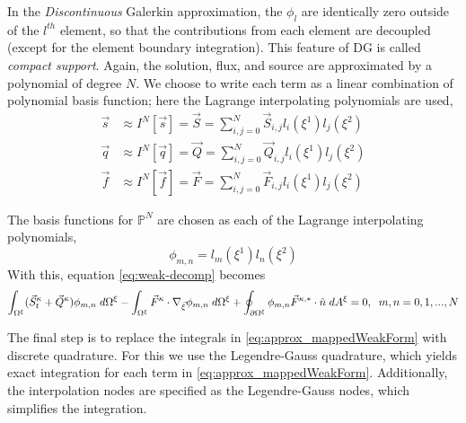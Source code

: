 \documentclass{softwaremanual}
\begin{document}
In the \textit{Discontinuous} Galerkin approximation, the $\phi_l$ are identically zero outside of the $l^{th}$ element, so that the contributions from each element are decoupled (except for the element boundary integration). This feature of DG is called \textit{compact support}. Again, the solution, flux, and source are approximated by a polynomial of degree $N$. We choose to write each term as a linear combination of polynomial basis function; here the Lagrange interpolating polynomials are used,
\begin{subequations}
    \begin{align}
    \vec{s} &\approx I^N[\vec{s}] = \vec{S} =  \sum_{i,j=0}^N \vec{S}_{i,j} l_i(\xi^1) l_j(\xi^2) \\
    \vec{q} &\approx I^N[\vec{q}]= \vec{Q} = \sum_{i,j=0}^N \vec{Q}_{i,j} l_i(\xi^1) l_j(\xi^2) \\
    \vec{f} &\approx I^N[\vec{f}] =\vec{F}= \sum_{i,j=0}^N \vec{F}_{i,j} l_i(\xi^1) l_j(\xi^2)
    \end{align}
 \end{subequations}


The basis functions for $\mathbb{P}^N$ are chosen as each of the Lagrange interpolating polynomials, 
 \begin{equation}
 \phi_{m,n} = l_m(\xi^1) l_n(\xi^2)
 \end{equation}
 With this, equation \eqref{eq:weak-decomp} becomes
   \begin{equation}
  \int_{\Omega^\xi} (\vec{S}^\kappa_t + \vec{Q}^\kappa) \phi_{m,n}  \hspace{1mm} d\Omega^\xi  - \int_{\Omega^\xi} \vec{F}^\kappa \cdot \nabla_{\vec{\xi}} \phi_{m,n}   \hspace{1mm} d\Omega^\xi + \oint_{\partial \Omega^\xi} \phi_{m,n}  \vec{F}^{\kappa,*}  \cdot \hat{n} \hspace{1mm} d A^\xi = 0, \hspace{2mm} m,n=0,1,...,N  \label{eq:weak-decomp-basis}
  \end{equation}
  
The final step is to replace the integrals in \eqref{eq:approx_mappedWeakForm} with discrete quadrature. For this we use the Legendre-Gauss quadrature, which yields exact integration for each term in \eqref{eq:approx_mappedWeakForm}. Additionally, the interpolation nodes are specified as the Legendre-Gauss nodes, which simplifies the integration.
\end{document}
